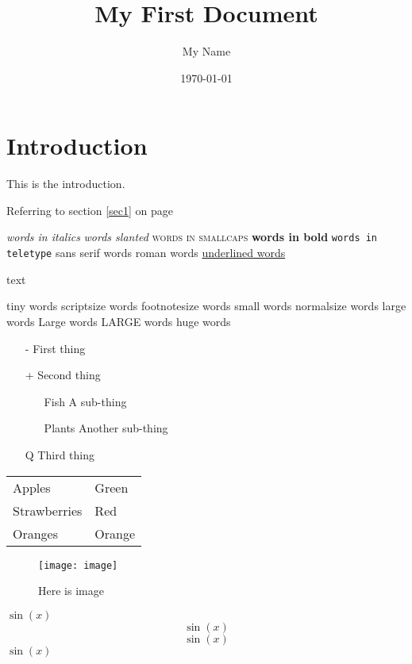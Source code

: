 \documentclass[a4paper,12pt]{article}
\begin{document}
\title{My First Document}
\author{My Name}
\date{\today}
\maketitle

\section{Introduction}
This is the introduction.

Referring to section \ref{sec1} on page \pageref{sec1}

\tableofcontents
\newpage
{}

\textit{words in italics}
\textsl{words slanted}
\textsc{words in smallcaps}
\textbf{words in bold}
\texttt{words in teletype}
\textsf{sans serif words}
\textrm{roman words}
\underline{underlined words}

{\color{colour_name}text}

{\tiny tiny words}
{\scriptsize scriptsize words}
{\footnotesize footnotesize words}
{\small small words}
{\normalsize normalsize words}
{\large large words}
{\Large Large words}
{\LARGE LARGE words}
{\huge huge words}

\begin{itemize}
\item[-] First thing
\item[+] Second thing
\begin{itemize}
\item[Fish] A sub-thing
\item[Plants] Another sub-thing
\end{itemize}
\item[Q] Third thing
\end{itemize}

\begin{tabular}{|l|l|}
Apples & Green \\
Strawberries & Red \\
Oranges & Orange \\
\end{tabular}

\begin{figure}[h]
\centering
\texttt{[image: image]}
\caption{Here is image}
\label{image}
\end{figure}

$\sin(x)$
$$\sin(x)$$
\[\sin(x)\]
\(\sin(x)\)
\end{document}
